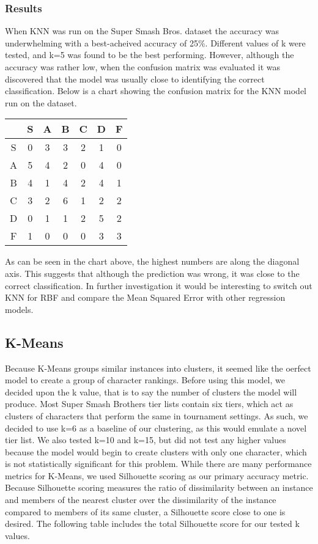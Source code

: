 \documentclass{article}
\begin{document}
\subsubsection{Results}
When KNN was run on the Super Smash Bros. dataset the accuracy was underwhelming with a best-acheived accuracy of 25\%. Different values of k were tested, and k=5 was found to be the best performing. However, although the accuracy was rather low, when the confusion matrix was evaluated it was discovered that the model was usually close to identifying the correct classification. Below is a chart showing the confusion matrix for the KNN model run on the dataset.
\linebreak
\begin{center}
\begin{tabular}{c | c | c | c | c | c | c}
   & S & A & B & C & D & F \\ \hline
 S & 0 & 3 & 3 & 2 & 1 & 0 \\ \hline
 A & 5 & 4 & 2 & 0 & 4 & 0 \\ \hline
 B & 4 & 1 & 4 & 2 & 4 & 1 \\ \hline
 C & 3 & 2 & 6 & 1 & 2 & 2 \\ \hline
 D & 0 & 1 & 1 & 2 & 5 & 2 \\ \hline
 F & 1 & 0 & 0 & 0 & 3 & 3 \\ \hline
\end{tabular}
\end{center}
As can be seen in the chart above, the highest numbers are along the diagonal axis. This suggests that although the prediction was wrong, it was close to the correct classification. In further investigation it would be interesting to switch out KNN for RBF and compare the Mean Squared Error with other regression models.
\subsection{K-Means}

Because K-Means groups similar instances into clusters, it seemed like the oerfect model to create a group of character rankings.
Before using this model, we decided upon the k value, that is to say the number of clusters the model will produce.
Most Super Smash Brothers tier lists contain six tiers, which act as clusters of characters that perform the same in tournament settings.
As such, we decided to use k=6 as a baseline of our clustering, as this would emulate a novel tier list.
We also tested k=10 and k=15, but did not test any higher values because the model would begin to create clusters with only one character, which is not statistically significant for this problem.
While there are many performance metrics for K-Means, we used Silhouette scoring as our primary accuracy metric.
Because Silhouette scoring measures the ratio of dissimilarity between an instance and members of the nearest cluster over the dissimilarity of the instance compared to members of its same cluster, a Silhouette score close to one is desired.
The following table includes the total Silhouette score for our tested k values.
\end{document}
